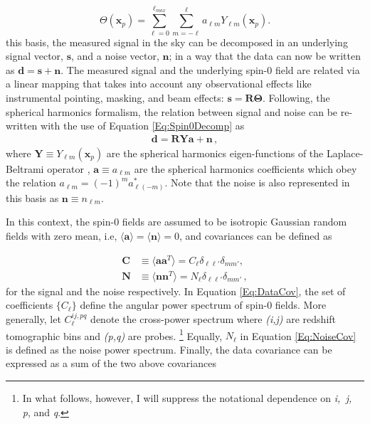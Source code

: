 \begin{equation}
\Theta (\mathbf{x}_p) = \sum_{\ell=0}^{\ell_{max}}\sum_{m=-\ell}^{\ell}a_{\ell m}Y_{\ell m}(\mathbf{x}_p).
\label{Eq:Spin0Decomp}
\end{equation}
\noindent this basis, the measured signal in the sky can be decomposed in an underlying signal vector, $\mathbf{s}$, and a noise vector, $\mathbf{n}$; in a way that the data can now be written as $\mathbf{d=s+n}$. The measured signal and the underlying spin-0 field are related via a linear mapping that takes into account any observational effects like instrumental pointing, masking, and beam effects: $\mathbf{s = R\Theta}$. Following, the spherical harmonics formalism, the relation between signal and noise can be re-written with the use of Equation \eqref{Eq:Spin0Decomp} as
\begin{align}
\mathbf{d=RYa+n}\, ,
\label{Eq:DataDecomposed}
\end{align}
\noindent  where $\mathbf{Y} \equiv Y_{\ell m}(\textbf{x}_p)$ are the spherical harmonics eigen-functions of the Laplace-Beltrami operator \citep{2008DahlenSimons}, $\mathbf{a} \equiv a_{\ell m}$ are the spherical harmonics coefficients which obey the relation $a_{\ell m} = (-1)^{m}a^*_{\ell (-m)}$. Note that the noise is also represented in this basis as $\textbf{n} \equiv n_{\ell m}$. 

\qquad In this context, the spin-0 fields are assumed to be isotropic Gaussian random fields with zero mean, i.e, $\langle \textbf{a} \rangle = \langle \textbf{n} \rangle = 0$, and covariances can be defined as

\begin{align}
\label{Eq:DataCov} \mathbf{C} & \equiv \langle \textbf{a} \textbf{a}^T \rangle = C_{\ell}\delta_{\ell \ell'}\delta_{m m'}, \\ 
\label{Eq:NoiseCov} \mathbf{N} & \equiv \langle \textbf{n} \textbf{n}^T \rangle = N_{\ell}\delta_{\ell \ell'}\delta_{m m'} \, , 
\end{align}
\noindent for the signal and the noise respectively. In Equation \eqref{Eq:DataCov}, the set of coefficients $\{C_{\ell}\}$ define the angular power spectrum of spin-0 fields. More generally, let $C_{\ell}^{ij, pq}$ denote the cross-power spectrum where \textit{(i,j)} are redshift tomographic bins and \textit{(p,q)} are probes. \footnote{In what follows, however, I will suppress the notational dependence on \textit{i,\, j,\, p}, and \textit{q}.} Equally, $N_{\ell}$ in Equation \eqref{Eq:NoiseCov} is defined as the noise power spectrum. Finally, the data covariance can be expressed as a sum of the two above covariances

